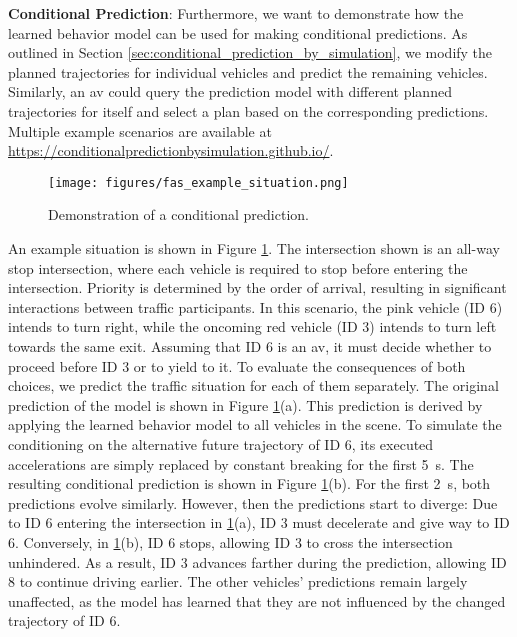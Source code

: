 \documentclass[a4paper,12pt,onecolumn]{article}
\begin{document}
\textbf{Conditional Prediction}: 
Furthermore, we want to demonstrate how the learned behavior model can be used for making conditional predictions. As outlined in Section \ref{sec:conditional_prediction_by_simulation}, we modify the planned trajectories for individual vehicles and predict the remaining vehicles. Similarly, an \gls{av} could query the prediction model with different planned trajectories for itself and select a plan based on the corresponding predictions. Multiple example scenarios are available at \href{https://conditionalpredictionbysimulation.github.io/}{https://conditionalpredictionbysimulation.github.io/}.

\begin{figure}[b!]
\vspace{-9pt}
\centering
\texttt{[image: figures/fas\_example\_situation.png]}
\vspace{-12pt}
\caption{Demonstration of a conditional prediction.} 
\vspace{-8pt}
\label{fig:conditional_prediction_example}
\vspace{-24pt}
\end{figure}

An example situation is shown in Figure \ref{fig:conditional_prediction_example}. The intersection shown is an all-way stop intersection, where each vehicle is required to stop before entering the intersection. Priority is determined by the order of arrival, resulting in significant interactions between traffic participants. 
In this scenario, the pink vehicle (ID 6) intends to turn right, while the oncoming red vehicle (ID 3) intends to turn left towards the same exit. Assuming that ID 6 is an \gls{av}, it must decide whether to proceed before ID 3 or to yield to it. To evaluate the consequences of both choices, we predict the traffic situation for each of them separately. 
The original prediction of the model is shown in Figure \ref{fig:conditional_prediction_example}(a). This prediction is derived by applying the learned behavior model to all vehicles in the scene. To simulate the conditioning on the alternative future trajectory of ID 6, its executed accelerations are simply replaced by constant breaking for the first \SI{5}{s}. The resulting conditional prediction is shown in Figure \ref{fig:conditional_prediction_example}(b). For the first \SI{2}{s}, both predictions evolve similarly. However, then the predictions start to diverge: Due to ID 6 entering the intersection in \ref{fig:conditional_prediction_example}(a), ID 3 must decelerate and give way to ID 6. Conversely, in \ref{fig:conditional_prediction_example}(b), ID 6 stops, allowing ID 3 to cross the intersection unhindered. As a result, ID 3 advances farther during the prediction, allowing ID 8 to continue driving earlier. The other vehicles' predictions remain largely unaffected, as the model has learned that they are not influenced by the changed trajectory of ID 6.
\end{document}
